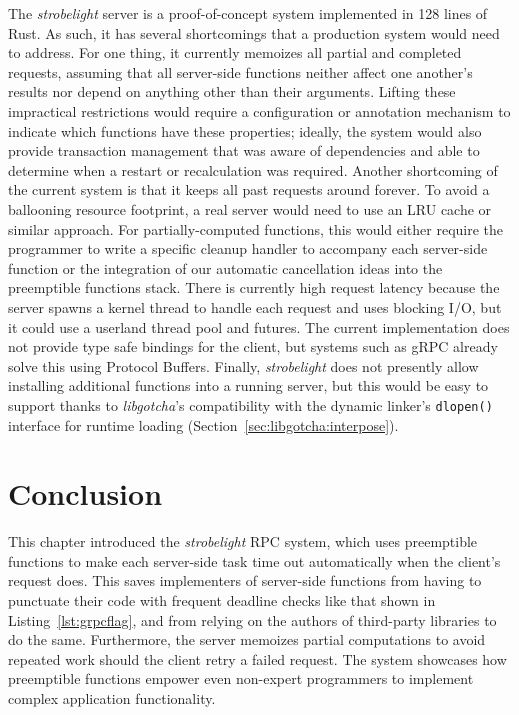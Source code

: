 The \textit{strobelight} server is a proof-of-concept system implemented in 128 lines
of Rust.  As such, it has several shortcomings that a production system would need to
address.  For one thing, it currently memoizes all partial and completed requests,
assuming that all server-side functions neither affect one another's results nor
depend on anything other than their arguments.  Lifting these impractical
restrictions would require a configuration or annotation mechanism to indicate which
functions have these properties; ideally, the system would also provide transaction
management that was aware of dependencies and able to determine when a
restart or recalculation was required.  Another shortcoming of the current system is
that it keeps all past requests around forever.  To avoid a ballooning resource
footprint, a real server would need to use an LRU cache or similar approach.  For
partially-computed functions, this would either require the programmer to write a
specific cleanup handler to accompany each server-side function or the integration of
our automatic cancellation ideas into the preemptible functions stack.  There is
currently high request latency because the server spawns a kernel thread to handle
each request and uses blocking I/O, but it could use a userland thread pool and
futures.  The current
implementation does not provide type safe bindings for the client, but systems such
as gRPC already solve this using Protocol Buffers.  Finally, \textit{strobelight}
does not presently allow installing additional functions into a running server, but
this would be easy to support thanks to \textit{libgotcha}'s compatibility with the
dynamic linker's \texttt{dlopen()} interface for runtime loading
(Section~\ref{sec:libgotcha:interpose}).


\section{Conclusion}

This chapter introduced the \textit{strobelight} RPC system, which uses preemptible
functions to make each server-side task time out automatically when the client's
request does.  This saves implementers of server-side functions from having to
punctuate their code with frequent deadline checks like that shown in
Listing~\ref{lst:grpcflag}, and from relying on the authors of third-party libraries
to do the same.  Furthermore, the server memoizes partial computations to avoid
repeated work should the client retry a failed request.  The system showcases how
preemptible functions empower even non-expert programmers to implement complex
application functionality.
